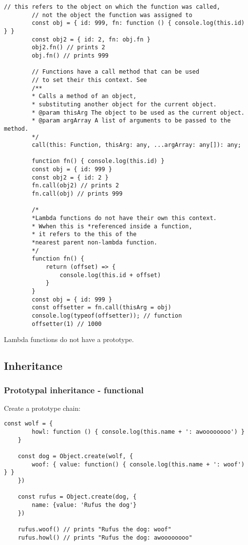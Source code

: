 \documentclass{scrartcl}
\begin{document}
    \begin{lstlisting}[style=ES6]
        // this refers to the object on which the function was called,
        // not the object the function was assigned to
        const obj = { id: 999, fn: function () { console.log(this.id) } }
        const obj2 = { id: 2, fn: obj.fn }
        obj2.fn() // prints 2
        obj.fn() // prints 999

        // Functions have a call method that can be used
        // to set their this context. See
        /**
        * Calls a method of an object,
        * substituting another object for the current object.
        * @param thisArg The object to be used as the current object.
        * @param argArray A list of arguments to be passed to the method.
        */
        call(this: Function, thisArg: any, ...argArray: any[]): any;

        function fn() { console.log(this.id) }
        const obj = { id: 999 }
        const obj2 = { id: 2 }
        fn.call(obj2) // prints 2
        fn.call(obj) // prints 999

        /*
        *Lambda functions do not have their own this context.
        * Wwhen this is *referenced inside a function,
        * it refers to the this of the
        *nearest parent non-lambda function.
        */
        function fn() {
            return (offset) => {
                console.log(this.id + offset)
            }
        }
        const obj = { id: 999 }
        const offsetter = fn.call(thisArg = obj)
        console.log(typeof(offsetter)); // function
        offsetter(1) // 1000
    \end{lstlisting}


    Lambda functions do not have a prototype.



\subsection{Inheritance}
\subsubsection{Prototypal inheritance - functional}
    Create a prototype chain:
\begin{lstlisting}[style=ES6]
    const wolf = {
        howl: function () { console.log(this.name + ': awoooooooo') }
    }

    const dog = Object.create(wolf, {
        woof: { value: function() { console.log(this.name + ': woof') } }
    })

    const rufus = Object.create(dog, {
        name: {value: 'Rufus the dog'}
    })

    rufus.woof() // prints "Rufus the dog: woof"
    rufus.howl() // prints "Rufus the dog: awoooooooo"
\end{lstlisting}
\end{document}

